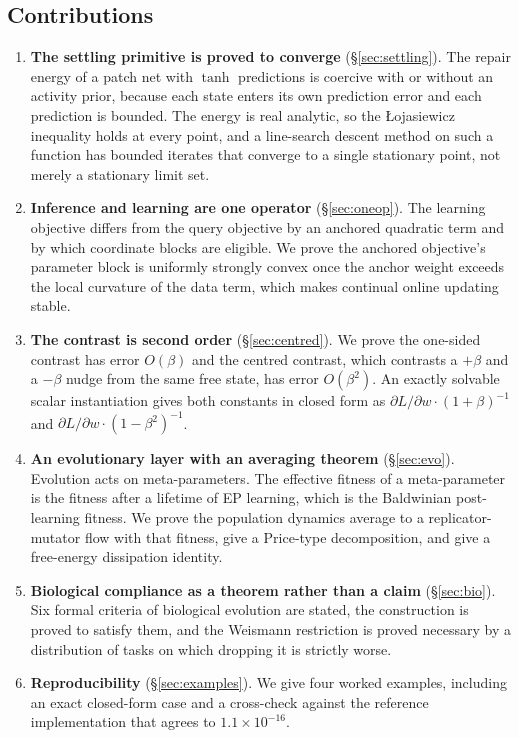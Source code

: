 \documentclass[11pt]{article}
\theoremstyle{definition}
\theoremstyle{remark}
\begin{document}
\subsection{Contributions}
\begin{enumerate}
\item \textbf{The settling primitive is proved to converge} (\S\ref{sec:settling}). The repair energy of
a patch net with $\tanh$ predictions is coercive with or without an activity prior, because each state
enters its own prediction error and each prediction is bounded. The energy is real analytic, so the
Łojasiewicz inequality holds at every point, and a line-search descent method on such a function has
bounded iterates that converge to a single stationary point, not merely a stationary limit set.
\item \textbf{Inference and learning are one operator} (\S\ref{sec:oneop}). The learning objective
differs from the query objective by an anchored quadratic term and by which coordinate blocks are
eligible. We prove the anchored objective's parameter block is uniformly strongly convex once the
anchor weight exceeds the local curvature of the data term, which makes continual online updating
stable.
\item \textbf{The contrast is second order} (\S\ref{sec:centred}). We prove the one-sided contrast has
error $O(\beta)$ and the centred contrast, which contrasts a $+\beta$ and a $-\beta$ nudge from the
same free state, has error $O(\beta^2)$. An exactly solvable scalar instantiation gives both constants
in closed form as $\partial L/\partial w \cdot (1+\beta)^{-1}$ and
$\partial L/\partial w \cdot (1-\beta^2)^{-1}$.
\item \textbf{An evolutionary layer with an averaging theorem} (\S\ref{sec:evo}). Evolution acts on
meta-parameters. The effective fitness of a meta-parameter is the fitness after a lifetime of EP
learning, which is the Baldwinian post-learning fitness. We prove the population dynamics average to a
replicator-mutator flow with that fitness, give a Price-type decomposition, and give a free-energy
dissipation identity.
\item \textbf{Biological compliance as a theorem rather than a claim} (\S\ref{sec:bio}). Six formal criteria
of biological evolution are stated, the construction is proved to satisfy them, and the Weismann
restriction is proved necessary by a distribution of tasks on which dropping it is strictly worse.
\item \textbf{Reproducibility} (\S\ref{sec:examples}). We give four worked examples, including an exact
closed-form case and a cross-check against the reference implementation that agrees to
$1.1\times10^{-16}$.
\end{enumerate}
\end{document}
